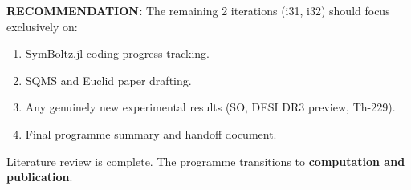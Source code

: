 \documentclass[11pt,a4paper]{article}
\begin{document}
\textbf{RECOMMENDATION:} The remaining 2 iterations (i31, i32) should focus exclusively on:
\begin{enumerate}
\item SymBoltz.jl coding progress tracking.
\item SQMS and Euclid paper drafting.
\item Any genuinely new experimental results (SO, DESI DR3 preview, Th-229).
\item Final programme summary and handoff document.
\end{enumerate}

Literature review is complete. The programme transitions to \textbf{computation and publication}.
\end{document}
